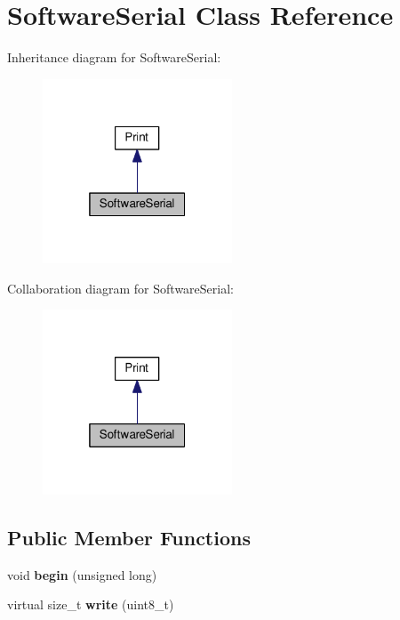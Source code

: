 \hypertarget{class_software_serial}{}\section{Software\+Serial Class Reference}
\label{class_software_serial}


Inheritance diagram for Software\+Serial\+:\nopagebreak
\begin{figure}[H]
\begin{center}
\leavevmode
\includegraphics[width=160pt]{class_software_serial__inherit__graph}
\end{center}
\end{figure}


Collaboration diagram for Software\+Serial\+:\nopagebreak
\begin{figure}[H]
\begin{center}
\leavevmode
\includegraphics[width=160pt]{class_software_serial__coll__graph}
\end{center}
\end{figure}
\subsection*{Public Member Functions}
\begin{DoxyCompactItemize}
\item 
void {\bfseries begin} (unsigned long)\hypertarget{class_software_serial_a2c080b19d958967689c3fad7b6620844}{}\label{class_software_serial_a2c080b19d958967689c3fad7b6620844}

\item 
virtual size\+\_\+t {\bfseries write} (uint8\+\_\+t)\hypertarget{class_software_serial_a1481a56fb169a6529af6277bd87d39ac}{}\label{class_software_serial_a1481a56fb169a6529af6277bd87d39ac}

\end{DoxyCompactItemize}
